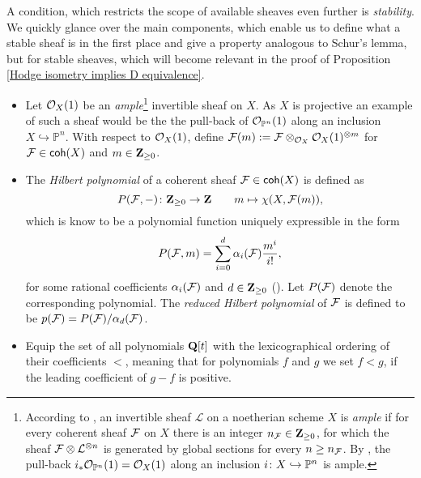 A condition, which restricts the scope of available sheaves even further is \emph{stability}. We quickly glance over the main components, which enable us to define what a stable sheaf is in the first place and give a property analogous to Schur's lemma, but for stable sheaves, which will become relevant in the proof of Proposition \ref{Hodge isometry implies D equivalence}.
\begin{itemize}[label = $\vartriangleright$]
    \item{
        Let ${\mathcal{O}_{X}}(1)$ be an \emph{ample}\footnote{
            According to \cite[\S II.7]{Hartshorne1977}, an invertible sheaf $\mathcal L$ on a noetherian scheme $X$ is \emph{ample} if for every coherent sheaf $\mathcal F$ on $X$ there is an integer $n_\mathcal F \in \mathbf Z_{\geq 0}$, for which the sheaf $\mathcal F \otimes \mathcal L^{\otimes n}$ is generated by global sections for every $n \geq n_\mathcal F$. By \cite[\S II, Example 7.6.1]{Hartshorne1977}, the pull-back $i_*{\mathcal{O}_{\mathbb P^n}}(1) = {\mathcal{O}_{X}}(1)$ along an inclusion $i \colon X \hookrightarrow \mathbb P^n$ is ample. 
        } invertible sheaf on $X$. As $X$ is projective an example of such a sheaf would be the the pull-back of ${\mathcal{O}_{\mathbb P^n}}(1)$ along an inclusion $X \hookrightarrow \mathbb{P}^n$. With respect to ${\mathcal{O}_{X}}(1)$, define 
        $\mathcal F(m) := \mathcal F \otimes_{{\mathcal{O}_{X}}} {\mathcal{O}_{X}}(1)^{\otimes m}$ for $\mathcal F \in \mathsf{coh}(X)$ and $m \in \mathbf Z_{\geq 0}$.
        }
    \item{
        The \emph{Hilbert polynomial} of a coherent sheaf $\mathcal F \in \mathsf{coh}(X)$ is defined as
        \[
            P(\mathcal F, -) \colon \mathbf Z_{\geq 0} \to \mathbf Z \qquad m \mapsto \chi(X, \mathcal F(m)),
        \]
        which is know to be a polynomial function uniquely expressible in the form 
        \[
            P(\mathcal F, m) = \sum_{i = 0}^d \alpha_i(\mathcal F)\frac{m^i}{i!},
        \]
        for some rational coefficients $\alpha_i(\mathcal F)$ and $d \in \mathbf Z_{\geq 0}$ (\cf \cite[\S I.1.2, Lemma 1.2.1]{HuybrechtsLehn2010}). Let $P(\mathcal F)$ denote the corresponding polynomial. The \emph{reduced Hilbert polynomial} of $\mathcal F$ is defined to be $p(\mathcal F) = P(\mathcal F)/\alpha_d(\mathcal F)$. 
    }
    \item{
        Equip the set of all polynomials $\mathbf Q[t]$ with the lexicographical ordering of their coefficients $<$, meaning that for polynomials $f$ and $g$ we set $f < g$, if the leading coefficient of $g - f$ is positive. 
    }

\end{itemize}
